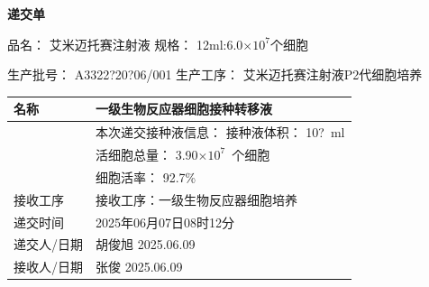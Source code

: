 \documentclass[UTF8,10pt,a4paper,fontset=fandol]{ctexart}
\newcommand{\fieldvalue}[1]{#1}
\newcommand{\handwritten}[1]{#1}
\begin{document}
\begin{center}
\textbf{递交单}
\end{center}

品名：
\fieldvalue{艾米迈托赛注射液}
\hfill
规格：
\fieldvalue{12ml:6.0$\times10^{7}$个细胞}

生产批号：
\fieldvalue{\handwritten{A3322?20?06/001}}
\hfill
生产工序：
\fieldvalue{艾米迈托赛注射液P2代细胞培养}

\vspace{2mm}

\begin{center}
\begin{tabularx}{0.9\textwidth}{|>{\centering\arraybackslash}p{}|X|}
\hline
名称 &
\fieldvalue{一级生物反应器细胞接种转移液}\\
\hline
\multirow{3}{*}{信息} &
本次递交接种液信息：\newline
接种液体积：
\fieldvalue{\handwritten{10?}}\ ml\\
&
活细胞总量：
\fieldvalue{\handwritten{3.90$\times10^{7}$}}\ 个细胞\\
&
细胞活率：
\fieldvalue{\handwritten{92.7}}\%\\
\hline
接收工序 &
接收工序：一级生物反应器细胞培养\\
\hline
递交时间 &
\fieldvalue{\handwritten{2025年06月07日08时12分}}\\
\hline
递交人/日期 &
\fieldvalue{\handwritten{胡俊旭}}\quad
\fieldvalue{\handwritten{2025.06.09}}\\
\hline
接收人/日期 &
\fieldvalue{\handwritten{张俊}}\quad
\fieldvalue{\handwritten{2025.06.09}}\\
\hline
\end{tabularx}
\end{center}
\end{document}
